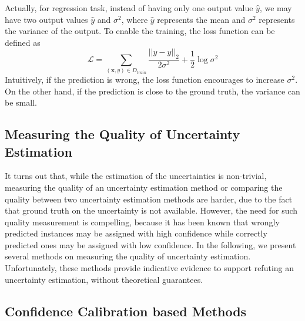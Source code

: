 Actually, for regression task, instead of having only one output value $\hat{y}$, we may have two output values $\hat{y}$ and $\sigma^2$, where $\hat{y}$ represents the mean and $\sigma^2$ represents the variance of the output. To enable the training, the loss function can be defined as 
\begin{equation}
    \mathcal{L} = \sum_{(\textbf{x},y)\in D_{train}}\frac{||y-\hat{y}||_2}{2\sigma^2} + \frac{1}{2}\log \sigma^2
\end{equation}
Intuitively, if the prediction is wrong, the loss function encourages to increase $\sigma^2$. On the other hand, if the prediction is close to the ground truth, the variance can be small. 


\subsection{Measuring the Quality of Uncertainty Estimation} 

It turns out that, while the estimation of the uncertainties is non-trivial, measuring the quality of an uncertainty estimation method or comparing the quality between two uncertainty estimation methods are harder, due to the fact that ground truth on the uncertainty is not available. However, the need for such quality measurement is compelling, because it has been known that wrongly predicted instances may be assigned with high confidence while correctly predicted ones may be assigned with low confidence.  In the following, we present several methods on measuring the quality of uncertainty estimation. Unfortunately, these methods provide indicative evidence to support refuting an uncertainty estimation, without theoretical guarantees. 

\subsection{Confidence Calibration based Methods} 


